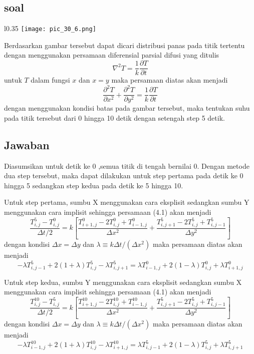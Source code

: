 \documentclass[a4paper,12pt]{article}
\numberwithin{equation}{section} %
\begin{document}
\subsection{soal}
\begin{wrapfigure}{l}{0.35\textwidth} %
    \centering
    \texttt{[image: pic\_30\_6.png]}
\end{wrapfigure}
Berdasarkan gambar tersebut dapat dicari distribusi panas pada titik tertentu dengan menggunakan persamaan diferensial parsial difusi yang ditulis
$$\nabla ^2 T = \frac{1}{k} \frac{\partial T}{\partial t}$$
untuk $T$ dalam fungsi $x$ dan $x=y$ maka persamaan diatas akan menjadi
\begin{equation}
\frac{\partial ^2 T}{\partial x^2} + \frac{\partial ^2 T}{\partial y^2} = \frac{1}{k} \frac{\partial T}{\partial t}
\end{equation}
dengan menggunakan kondisi batas pada gambar tersebut, maka tentukan suhu pada titik tersebut dari 0 hingga 10 detik dengan setengah step 5 detik.
\subsection{Jawaban}
Diasumsikan untuk detik ke 0 ,semua titik di tengah bernilai 0. Dengan metode dua step tersebut, maka dapat dilakukan untuk step pertama pada detik ke 0 hingga 5 sedangkan step kedua pada detik ke 5 hingga 10.

Untuk step pertama, sumbu X menggunakan cara eksplisit sedangkan sumbu Y menggunakan cara implisit sehingga persamaan (4.1) akan menjadi
$$\frac{T_{i,j}^5-T_{i,j}^0}{\Delta t/2} = k\left[\frac{T_{i+1,j}^0 - 2T_{i,j}^0 + T_{i-1,j}^0}{\Delta x^2} + \frac{T_{i,j+1}^5 - 2T_{i,j}^5 + T_{i,j-1}^5}{\Delta y^2}\right ]$$
dengan kondisi $\Delta x = \Delta y$ dan $\lambda \equiv k\Delta t / (\Delta x^2)$ maka persamaan diatas akan menjadi
\begin{equation}
-\lambda T_{i,j-1}^5 + 2(1+ \lambda)T_{i,j}^5 - \lambda T_{i,j+1}^5 = \lambda T_{i-1,j}^0 + 2(1-\lambda)T_{i,j}^0 + \lambda T_{i+1,j}^0 
\end{equation}

Untuk step kedua, sumbu Y menggunakan cara eksplisit sedangkan sumbu X menggunakan cara implisit sehingga persamaan (4.1) akan menjadi
$$\frac{T_{i,j}^{10} - T_{i,j}^5}{\Delta t/2} = k\left[\frac{T_{i+1,j}^{10} - 2T_{i,j}^{10} + T_{i-1,j}^{10}}{\Delta x^2} + \frac{T_{i,j+1}^5 - 2T_{i,j}^5 + T_{i,j-1}^5}{\Delta y^2}\right ]$$
dengan kondisi $\Delta x = \Delta y$ dan $\lambda \equiv k\Delta t / (\Delta x^2)$ maka persamaan diatas akan menjadi
\begin{equation}
-\lambda T_{i-1,j}^{10} + 2(1+ \lambda)T_{i,j}^{10} - \lambda T_{i+1,j}^{10} = \lambda T_{i,j-1}^5 + 2(1-\lambda)T_{i,j}^5 + \lambda T_{i,j+1}^5 
\end{equation}
\end{document}
